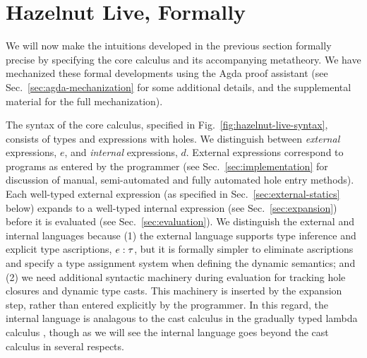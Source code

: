 
\clearpage
\newcommand{\calculusSec}{Hazelnut Live, Formally}
\section{\protect\calculusSec}
\label{sec:calculus}

We will now make the intuitions developed in the previous section formally precise by specifying the \HazelnutLive core calculus and  its accompanying metatheory. 
We have mechanized these formal developments using the Agda proof assistant \cite{norell:thesis,norell2009dependently} 
(see Sec.~\ref{sec:agda-mechanization} for some additional details, and the supplemental material for the full mechanization).

The syntax of the core calculus, specified in Fig.~\ref{fig:hazelnut-live-syntax}, consists of types and expressions with holes. 
We distinguish between \emph{external} expressions, $e$, and \emph{internal} expressions, $d$. 
External expressions correspond to programs as entered by the programmer 
(see Sec.~\ref{sec:implementation} for discussion of manual, semi-automated and fully automated hole entry methods). 
Each well-typed external expression (as specified in Sec.~\ref{sec:external-statics} below) expands to a well-typed internal expression (see Sec.~\ref{sec:expansion}) before it is evaluated (see Sec.~\ref{sec:evaluation}). 
We distinguish the external and internal languages because 
(1) the external language supports type inference and explicit type ascriptions, $e : \tau$, but it is  formally simpler to eliminate ascriptions and specify a type assignment system when defining the dynamic semantics; and 
(2) we need additional syntactic machinery during evaluation for tracking hole closures and dynamic type casts. 
This machinery is inserted by the expansion step, rather than entered explicitly by the programmer. 
In this regard, the internal language is analagous to the cast calculus in the gradually typed lambda calculus \cite{DBLP:conf/snapl/SiekVCB15,Siek06a}, though as we will see the \HazelnutLive internal language goes beyond the cast calculus in several respects.




